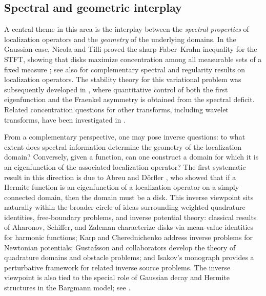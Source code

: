 \subsection{Spectral and geometric interplay}

A central theme in this area is the interplay between the \emph{spectral properties} of localization operators and the \emph{geometry} of the underlying domains. In the Gaussian case, Nicola and Tilli proved the sharp Faber--Krahn inequality for the STFT, showing that disks maximize concentration among all measurable sets of a fixed measure \cite{Nicola-Tilli}; see also \cite{Nicola-Tilli-2,Bastianoni-Cordero-Nicola,Bastianoni-Teofanov} for complementary spectral and regularity results on localization operators. The stability theory for this variational problem was subsequently developed in \cite{Gomez-Guerra-Ramos-Tilli}, where quantitative control of both the first eigenfunction and the Fraenkel asymmetry is obtained from the spectral deficit. Related concentration questions for other transforms, including wavelet transforms, have been investigated in \cite{Ramos-Tilli}.

From a complementary perspective, one may pose inverse questions: to what extent does spectral information determine the geometry of the localization domain? Conversely, given a function, can one construct a domain for which it is an eigenfunction of the associated localization operator? The first systematic result in this direction is due to Abreu and D\"orfler \cite{Abreu-Doerfler}, who showed that if a Hermite function is an eigenfunction of a localization operator on a simply connected domain, then the domain must be a disk. This inverse viewpoint sits naturally within the broader circle of ideas surrounding weighted quadrature identities, free-boundary problems, and inverse potential theory: classical results of Aharonov, Schiffer, and Zalcman \cite{Aharonov-Schiffer-Zalcman} characterize disks via mean-value identities for harmonic functions; Karp \cite{Karp} and Cherednichenko \cite{Cherednichenko} address inverse problems for Newtonian potentials; Gustafsson and collaborators \cite{Gustafsson,Gustafsson-Shahgholian,Shahgholian} develop the theory of quadrature domains and obstacle problems; and Isakov's monograph \cite{Isakov} provides a perturbative framework for related inverse source problems. The inverse viewpoint is also tied to the special role of Gaussian decay and Hermite structures in the Bargmann model; see \cite{Kulikov-Oliveira-Ramos,Goncalves-Oliveira-Steinerberger,Thangavelu}.

